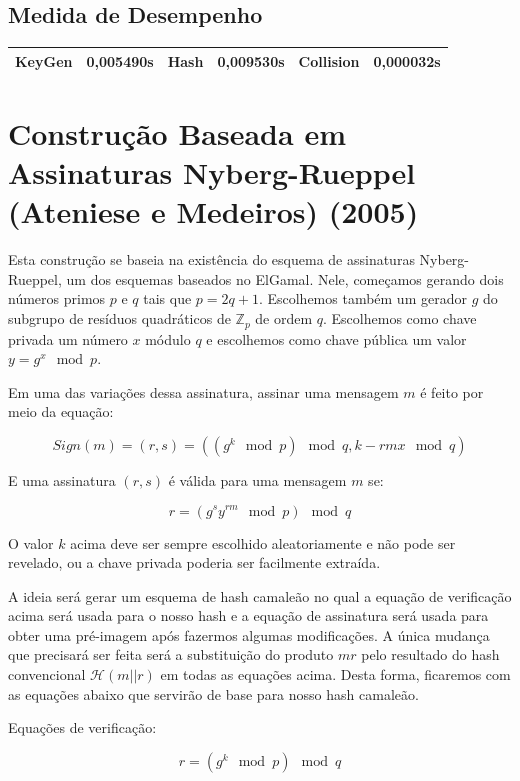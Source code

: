 \documentclass[a4paper]{article}
\begin{document}
 \subsection{Medida de Desempenho}
 
 \begin{center}
 \begin{tabular}{|c|c|c|c|c|c|}
 \hline
 KeyGen & 0,005490s & Hash & 0,009530s & Collision & 0,000032s\\
 \hline
 \end{tabular}
 \end{center}
 
 \section{Construção Baseada em Assinaturas Nyberg-Rueppel
 (Ateniese e Medeiros) (2005)\cite{ateniese2004key}}
 
 Esta construção se baseia na existência do esquema de assinaturas
 Nyberg-Rueppel, um dos esquemas baseados no ElGamal. Nele, começamos
 gerando dois números primos $p$ e $q$ tais que $p=2q+1$. Escolhemos
 também um gerador $g$ do subgrupo de resíduos quadráticos de
 $\mathbb{Z}_p$ de ordem $q$. Escolhemos como chave privada um número
 $x$ módulo $q$ e escolhemos como chave pública um valor $y=g^x \mod
 p$.
 
 Em uma das variações dessa assinatura, assinar uma mensagem $m$ é
 feito por meio da equação:
 
 $$
 Sign(m) = (r, s) = ((g^k \mod p) \mod q, k-rmx \mod q)
 $$
 
 E uma assinatura $(r, s)$ é válida para uma mensagem $m$ se:
 
 $$
 r = (g^sy^{rm} \mod p) \mod q
 $$
 
 O valor $k$ acima deve ser sempre escolhido aleatoriamente e não pode
 ser revelado, ou a chave privada poderia ser facilmente extraída.
 
 A ideia será gerar um esquema de hash camaleão no qual a equação de
 verificação acima será usada para o nosso hash e a equação de
 assinatura será usada para obter uma pré-imagem após fazermos algumas
 modificações. A única mudança que precisará ser feita será a
 substituição do produto $mr$ pelo resultado do hash convencional
 $\mathcal{H}(m||r)$ em todas as equações acima. Desta forma, ficaremos
 com as equações abaixo que servirão de base para nosso hash camaleão.
 
 Equações de verificação:
 
 $$
 r = (g^k \mod p) \mod q
 $$
 
\end{document}
